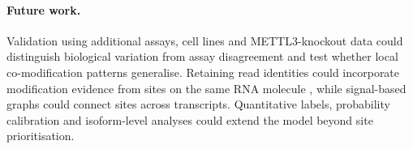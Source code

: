 \documentclass[11pt,a4paper]{article}
\begin{document}
\paragraph{Future work.}
Validation using additional assays, cell lines and METTL3-knockout data could distinguish biological variation from assay disagreement and test whether local co-modification patterns generalise. Retaining read identities could incorporate modification evidence from sites on the same RNA molecule \citep{m6aiso2025,kang2025}, while signal-based graphs could connect sites across transcripts. Quantitative labels, probability calibration and isoform-level analyses could extend the model beyond site prioritisation.

\clearpage
\renewcommand{\thepage}{S\arabic{page}}
\end{document}
